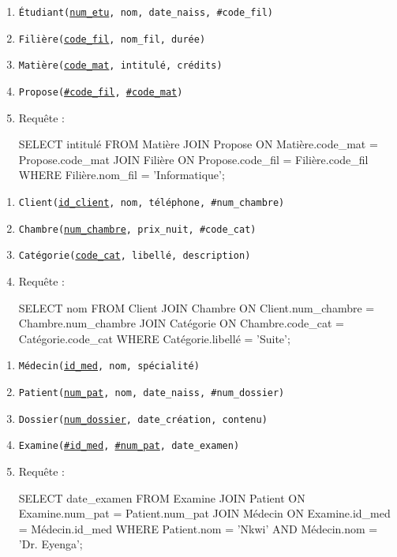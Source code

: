 \begin{enumerate}
    \item \texttt{Étudiant(\underline{num\_etu}, nom, date\_naiss, \#code\_fil)}
    \item \texttt{Filière(\underline{code\_fil}, nom\_fil, durée)}
    \item \texttt{Matière(\underline{code\_mat}, intitulé, crédits)}
    \item \texttt{Propose(\underline{\#code\_fil}, \underline{\#code\_mat})}
    \item Requête :
    \begin{sqlcode}
SELECT intitulé FROM Matière
JOIN Propose ON Matière.code_mat = Propose.code_mat
JOIN Filière ON Propose.code_fil = Filière.code_fil
WHERE Filière.nom_fil = 'Informatique';
    \end{sqlcode}
\end{enumerate}

\begin{enumerate}
    \item \texttt{Client(\underline{id\_client}, nom, téléphone, \#num\_chambre)}
    \item \texttt{Chambre(\underline{num\_chambre}, prix\_nuit, \#code\_cat)}
    \item \texttt{Catégorie(\underline{code\_cat}, libellé, description)}
    \item Requête :
    \begin{sqlcode}
SELECT nom FROM Client
JOIN Chambre ON Client.num_chambre = Chambre.num_chambre
JOIN Catégorie ON Chambre.code_cat = Catégorie.code_cat
WHERE Catégorie.libellé = 'Suite';
    \end{sqlcode}
\end{enumerate}

\begin{enumerate}
    \item \texttt{Médecin(\underline{id\_med}, nom, spécialité)}
    \item \texttt{Patient(\underline{num\_pat}, nom, date\_naiss, \#num\_dossier)}
    \item \texttt{Dossier(\underline{num\_dossier}, date\_création, contenu)}
    \item \texttt{Examine(\underline{\#id\_med}, \underline{\#num\_pat}, date\_examen)}
    \item Requête :
    \begin{sqlcode}
SELECT date_examen FROM Examine
JOIN Patient ON Examine.num_pat = Patient.num_pat
JOIN Médecin ON Examine.id_med = Médecin.id_med
WHERE Patient.nom = 'Nkwi' AND Médecin.nom = 'Dr. Eyenga';
    \end{sqlcode}
\end{enumerate}


